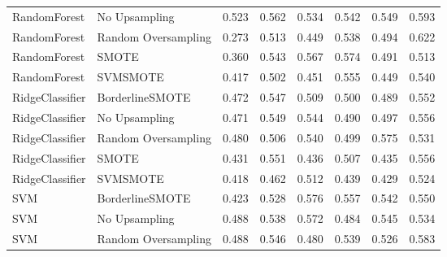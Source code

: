 \begin{tabular}{llllllll}
                RandomForest &       No Upsampling & 0.523 &                     0.562 &                 0.534 &                  0.542 &                                   0.549 &     0.593 \\
                RandomForest & Random Oversampling & 0.273 &                     0.513 &                 0.449 &                  0.538 &                                   0.494 &     0.622 \\
                RandomForest &               SMOTE & 0.360 &                     0.543 &                 0.567 &                  0.574 &                                   0.491 &     0.513 \\
                RandomForest &            SVMSMOTE & 0.417 &                     0.502 &                 0.451 &                  0.555 &                                   0.449 &     0.540 \\
             RidgeClassifier &     BorderlineSMOTE & 0.472 &                     0.547 &                 0.509 &                  0.500 &                                   0.489 &     0.552 \\
             RidgeClassifier &       No Upsampling & 0.471 &                     0.549 &                 0.544 &                  0.490 &                                   0.497 &     0.556 \\
             RidgeClassifier & Random Oversampling & 0.480 &                     0.506 &                 0.540 &                  0.499 &                                   0.575 &     0.531 \\
             RidgeClassifier &               SMOTE & 0.431 &                     0.551 &                 0.436 &                  0.507 &                                   0.435 &     0.556 \\
             RidgeClassifier &            SVMSMOTE & 0.418 &                     0.462 &                 0.512 &                  0.439 &                                   0.429 &     0.524 \\
                         SVM &     BorderlineSMOTE & 0.423 &                     0.528 &                 0.576 &                  0.557 &                                   0.542 &     0.550 \\
                         SVM &       No Upsampling & 0.488 &                     0.538 &                 0.572 &                  0.484 &                                   0.545 &     0.534 \\
                         SVM & Random Oversampling & 0.488 &                     0.546 &                 0.480 &                  0.539 &                                   0.526 &     0.583 \\

\end{tabular}
